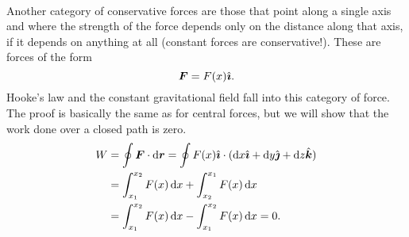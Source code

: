 \documentclass[../classical_mechanics.tex]{subfiles}
\begin{document}
        \paragraph{}
        Another category of conservative forces are those that point along a single axis and where the strength of the force depends only on the distance along that axis, if it depends on anything at all (constant forces are conservative!).
        These are forces of the form
        \begin{equation}
            \boldsymbol{F}=F(x)\hat{\boldsymbol{\imath}}.
        \end{equation}
        Hooke's law and the constant gravitational field fall into this category of force.
        The proof is basically the same as for central forces, but we will show that the work done over a closed path is zero.
        \begin{align}
            W&=\oint\vec{F}\cdot\dd{\vec{r}}=\oint F(x)\ihat\cdot(\dd{x}\ihat+\dd{y}\jhat+\dd{z}\khat)\\
            &=\int_{x_1}^{x_2}F(x)\dd{x}+\int_{x_2}^{x_1}F(x)\dd{x}\\
            &=\int_{x_1}^{x_2}F(x)\dd{x}-\int_{x_1}^{x_2}F(x)\dd{x}=0.
        \end{align}

\end{document}
